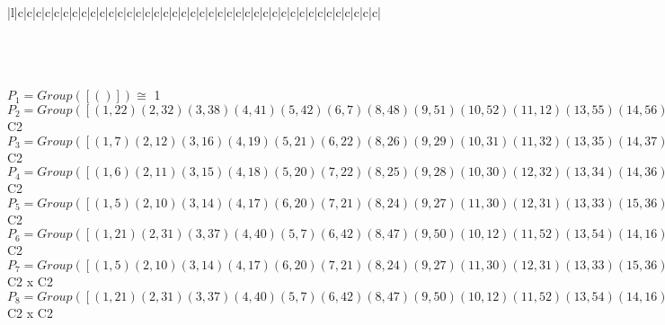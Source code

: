 \documentclass[varwidth=\maxdimen,border=10]{standalone}
\begin{document}
\begin{tabular}
\begin{array}{|l|c|c|c|c|c|c|c|c|c|c|c|c|c|c|c|c|c|c|c|c|c|c|c|c|c|c|c|c|c|c|c|c|c|c|c|c|c|c|c|c|}
\end{array}\)\\
\ \\
\ \\
$P_{1} = Group( [ () ] )\cong$ 1\ \\
$P_{2} = Group( [ ( 1,22)( 2,32)( 3,38)( 4,41)( 5,42)( 6, 7)( 8,48)( 9,51)(10,52)(11,12)(13,55)(14,56)(15,16)(17,57)(18,19)(20,21)(23,60)(24,61)(25,26)(27,62)(28,29)(30,31)(33,63)(34,35)(36,37)(39,40)(43,64)(44,45)(46,47)(49,50)(53,54)(58,59) ] )\cong$ C2\ \\
$P_{3} = Group( [ ( 1, 7)( 2,12)( 3,16)( 4,19)( 5,21)( 6,22)( 8,26)( 9,29)(10,31)(11,32)(13,35)(14,37)(15,38)(17,40)(18,41)(20,42)(23,45)(24,47)(25,48)(27,50)(28,51)(30,52)(33,54)(34,55)(36,56)(39,57)(43,59)(44,60)(46,61)(49,62)(53,63)(58,64) ] )\cong$ C2\ \\
$P_{4} = Group( [ ( 1, 6)( 2,11)( 3,15)( 4,18)( 5,20)( 7,22)( 8,25)( 9,28)(10,30)(12,32)(13,34)(14,36)(16,38)(17,39)(19,41)(21,42)(23,44)(24,46)(26,48)(27,49)(29,51)(31,52)(33,53)(35,55)(37,56)(40,57)(43,58)(45,60)(47,61)(50,62)(54,63)(59,64) ] )\cong$ C2\ \\
$P_{5} = Group( [ ( 1, 5)( 2,10)( 3,14)( 4,17)( 6,20)( 7,21)( 8,24)( 9,27)(11,30)(12,31)(13,33)(15,36)(16,37)(18,39)(19,40)(22,42)(23,43)(25,46)(26,47)(28,49)(29,50)(32,52)(34,53)(35,54)(38,56)(41,57)(44,58)(45,59)(48,61)(51,62)(55,63)(60,64) ] )\cong$ C2\ \\
$P_{6} = Group( [ ( 1,21)( 2,31)( 3,37)( 4,40)( 5, 7)( 6,42)( 8,47)( 9,50)(10,12)(11,52)(13,54)(14,16)(15,56)(17,19)(18,57)(20,22)(23,59)(24,26)(25,61)(27,29)(28,62)(30,32)(33,35)(34,63)(36,38)(39,41)(43,45)(44,64)(46,48)(49,51)(53,55)(58,60) ] )\cong$ C2\ \\
$P_{7} = Group( [ ( 1, 5)( 2,10)( 3,14)( 4,17)( 6,20)( 7,21)( 8,24)( 9,27)(11,30)(12,31)(13,33)(15,36)(16,37)(18,39)(19,40)(22,42)(23,43)(25,46)(26,47)(28,49)(29,50)(32,52)(34,53)(35,54)(38,56)(41,57)(44,58)(45,59)(48,61)(51,62)(55,63)(60,64), ( 1,22)( 2,32)( 3,38)( 4,41)( 5,42)( 6, 7)( 8,48)( 9,51)(10,52)(11,12)(13,55)(14,56)(15,16)(17,57)(18,19)(20,21)(23,60)(24,61)(25,26)(27,62)(28,29)(30,31)(33,63)(34,35)(36,37)(39,40)(43,64)(44,45)(46,47)(49,50)(53,54)(58,59) ] )\cong$ C2 x C2\ \\
$P_{8} = Group( [ ( 1,21)( 2,31)( 3,37)( 4,40)( 5, 7)( 6,42)( 8,47)( 9,50)(10,12)(11,52)(13,54)(14,16)(15,56)(17,19)(18,57)(20,22)(23,59)(24,26)(25,61)(27,29)(28,62)(30,32)(33,35)(34,63)(36,38)(39,41)(43,45)(44,64)(46,48)(49,51)(53,55)(58,60), ( 1,22)( 2,32)( 3,38)( 4,41)( 5,42)( 6, 7)( 8,48)( 9,51)(10,52)(11,12)(13,55)(14,56)(15,16)(17,57)(18,19)(20,21)(23,60)(24,61)(25,26)(27,62)(28,29)(30,31)(33,63)(34,35)(36,37)(39,40)(43,64)(44,45)(46,47)(49,50)(53,54)(58,59) ] )\cong$ C2 x C2\ \\

\end{tabular}
\end{document}
